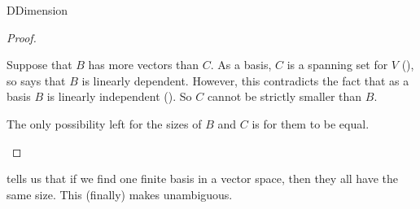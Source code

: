 \begin{subsect}{D}{Dimension}
\begin{proof}
%
\begin{para}Suppose that $B$ has more vectors than $C$.   As a basis, $C$ is a spanning set for $V$ (), so  says that $B$ is linearly dependent.  However, this contradicts the fact that as a basis $B$ is linearly independent ().  So $C$ cannot be strictly smaller than $B$.\end{para}
%
\begin{para}The only possibility left for the sizes of $B$ and $C$ is for them to be equal.\end{para}
%
\end{proof}
%
\begin{para} tells us that if we find one finite basis in a vector space, then they all have the same size.  This (finally) makes  unambiguous.\end{para}
%
\end{subsect}
%
